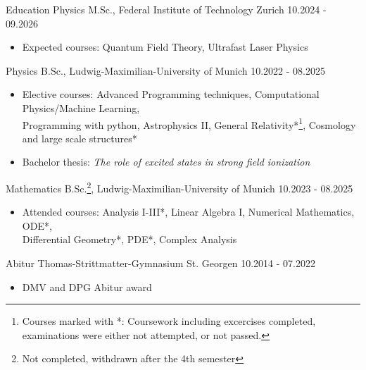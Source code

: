 \documentclass{resume}
\begin{document}
\begin{rSection}{Education}
    Physics M.Sc., Federal Institute of Technology Zurich \hfill 10.2024 - 09.2026
    \begin{itemize}\footnotesize
        \item Expected courses: Quantum Field Theory, Ultrafast Laser Physics
    \end{itemize}

    Physics B.Sc., Ludwig-Maximilian-University of Munich \hfill 10.2022 - 08.2025
    \begin{itemize}\footnotesize
        \item Elective courses: Advanced Programming techniques, Computational Physics/Machine Learning,\\Programming with python, Astrophysics II, General Relativity*\footnote{Courses marked with *: Coursework including excercises completed, examinations were either not attempted, or not passed.}, Cosmology and large scale structures*
        \item Bachelor thesis: \textit{The role of excited states in strong field ionization}
    \end{itemize}

    Mathematics B.Sc.\footnote{Not completed, withdrawn after the 4th semester}, Ludwig-Maximilian-University of Munich \hfill 10.2023 - 08.2025
    \begin{itemize}\footnotesize
        \item Attended courses: Analysis I-III*, Linear Algebra I, Numerical Mathematics, ODE*, \\Differential Geometry*, PDE*, Complex Analysis
    \end{itemize}

    Abitur Thomas-Strittmatter-Gymnasium St. Georgen \hfill 10.2014 - 07.2022
    \begin{itemize}\footnotesize
        \item DMV and DPG Abitur award
    \end{itemize}

\end{rSection}
\end{document}
